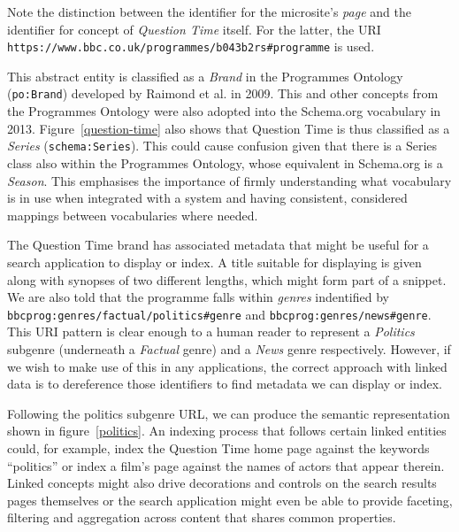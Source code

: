 Note the distinction between the identifier for the microsite's
\emph{page} and the identifier for concept of \emph{Question Time}
itself. For the latter, the URI
\texttt{https://www.bbc.co.uk/programmes/b043b2rs\#programme}
is used.\cite{raimond2010use}

This abstract entity is classified as a \emph{Brand} in the
Programmes Ontology\cite{raimond2009bbc} (\texttt{po:Brand})
developed by Raimond et al. in 2009. This and other concepts
from the Programmes Ontology were also adopted into the
Schema.org vocabulary in 2013.\cite{raimond2013schema}
Figure~\ref{question-time} also shows
that Question Time is thus classified as a \emph{Series}
(\texttt{schema:Series}). This could cause confusion given
that there is a Series class also within the Programmes Ontology,
whose equivalent in Schema.org is a \emph{Season}. This emphasises
the importance of firmly understanding what vocabulary is in use
when integrated with a system and having consistent, considered
mappings between vocabularies where needed.

The Question Time brand has associated metadata that might
be useful for a search application to display or index. A title
suitable for displaying is given along with synopses of two
different lengths, which might form part of a snippet. We are also
told that the programme falls within \emph{genres} indentified
by \texttt{bbcprog:genres/factual/politics\#genre} and
\texttt{bbcprog:genres/news\#genre}. This URI pattern is
clear enough to a human reader to represent a \emph{Politics}
subgenre (underneath a \emph{Factual} genre) and a
\emph{News} genre respectively. However, if we wish to make
use of this in any applications, the correct approach with
linked data is to dereference those identifiers to find
metadata we can display or index.

Following the politics subgenre URL, we can produce the
semantic representation shown in figure~\ref{politics}.
An indexing process that follows certain linked entities
could, for example, index the Question Time home page
against the keywords ``politics'' or index a film's
page against the names of actors that appear therein.
Linked concepts might also drive decorations and controls
on the search results pages themselves or the search
application might even be able to provide faceting, filtering
and aggregation across content that shares common properties.

\begin{sidewaysfigure}
  \begin{center}
    \begin{dot2tex}[dot,pgf,scale=0.41]
      
    \end{dot2tex}
  \end{center}
  \caption{Semantic metadata around the \emph{Politics} programme genre}
  \label{politics}
\end{sidewaysfigure}

